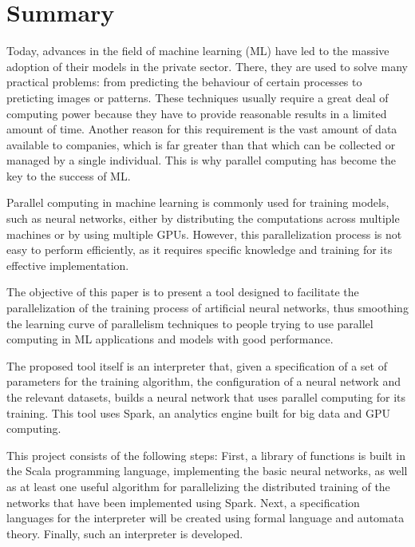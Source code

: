%

\chapter{Summary}

Today, advances in the field of machine learning (ML) have led to the massive adoption of their models in the private 
sector. There, they are used to solve many practical problems: from predicting the behaviour of certain processes to 
preticting images or patterns. These techniques usually require a great deal of computing power because they have to 
provide reasonable results in a limited amount of time. Another reason for this requirement is the vast amount of data 
available to companies, which is far greater than that which can be collected or managed by a single individual. This is 
why parallel computing has become the key to the success of ML.

\vspace{10pt}
Parallel computing in machine learning is commonly used for training models, such as neural networks, either by 
distributing the computations across multiple machines or by using multiple GPUs. However, this parallelization 
process is not easy to perform efficiently, as it requires specific knowledge and training for its effective 
implementation.

\vspace{10pt}
The objective of this paper is to present a tool designed to facilitate the parallelization of the training process of
artificial neural networks, thus smoothing the learning curve of parallelism techniques to people trying to use
parallel computing in ML applications and models with good performance.

\vspace{10pt}
The proposed tool itself is an interpreter that, given a specification of a set of parameters for the training 
algorithm, the configuration of a neural network and the relevant datasets, builds a neural network that uses parallel
computing for its training. This tool uses Spark, an analytics engine built for big data and GPU computing.

\vspace{10pt}
This project consists of the following steps: First, a library of functions is built in the Scala programming 
language, implementing the basic neural networks, as well as at least one useful algorithm for parallelizing the 
distributed training of the networks that have been implemented using Spark. Next, a specification languages for the 
interpreter will be created using formal language and automata theory. Finally, such an interpreter is developed.

